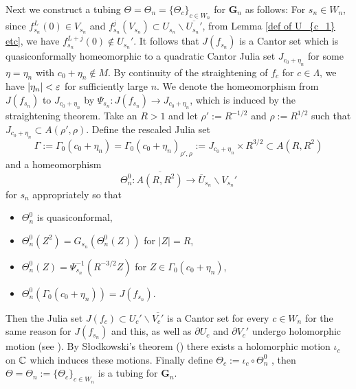 Next we construct a tubing 
$\Theta = \Theta_n = \{ \Theta_c \}_{c \in W_n}$ for $\boldsymbol{G}_n$
as follows: For $s_n \in W_n$,  since $f_{s_n}^L(0) \in V_{s_n}$ and 
$f_{s_n}^j(V_{s_n}) \subset U_{s_n} \smallsetminus \overline{U_{s_n}'}$, 
from Lemma \ref{def of U_{c_1} etc}, we have
$f_{s_n}^{L+j}(0) \notin U_{s_n}'$. It follows that $J(f_{s_n})$ is a
Cantor set which is quasiconformally homeomorphic to a quadratic Cantor
Julia set $J_{c_0+\eta_n}$ for some $\eta=\eta_n$ with 
$c_0+\eta_n \notin M$. By continuity of the straightening of $f_c$ for 
$c \in \Lambda$, we have $|\eta_n| < \varepsilon$ for sufficiently large $n$.
We denote the homeomorphism from $J(f_{s_n})$ to $J_{c_0+\eta_n}$ by 
$\Psi_{s_n} : J(f_{s_n}) \to J_{c_0+\eta_n}$, which
is induced by the straightening theorem.
Take an $R > 1$ and let $\rho' := R^{-1/2}$ and $\rho := R^{1/2}$ such
that $J_{c_0+\eta_n} \subset A(\rho', \rho)$. 
Define the rescaled Julia set
$$
  \Gamma := \Gamma_0(c_0+\eta_n) 
= \Gamma_0(c_0+\eta_n)_{\rho', \rho}
:= J_{c_0+\eta_n} \times R^{3/2}
\subset A(R, R^2) 
$$
and a homeomorphism
$$
\Theta_n^0 : \overline{A(R, R^2)} \to 
              \overline{U}_{s_n} \smallsetminus V_{s_n}'
$$ 
for $s_n$ appropriately so that 
\begin{itemize}
\setlength{\itemsep}{0.5mm} %
\item
$\Theta_n^0$ is quasiconformal,

\item
$\Theta_n^0(Z^2) = G_{s_n}(\Theta_n^0(Z))$ for $|Z| = R$, 

\item
$\Theta_n^0(Z) = \Psi_{s_n}^{-1}(R^{- 3/2}Z)$ 
for $Z \in \Gamma_0(c_0+\eta_n)$,

\item
$\Theta_n^0(\Gamma_0(c_0+\eta_n)) = J(f_{s_n})$. 
\end{itemize}

\noin 
Then the Julia set
$J(f_{c}) \subset U_c' \smallsetminus \overline{V_c'}$ is a Cantor set
for every $c \in W_n$ for the same reason for $J(f_{s_n})$ and this, 
as well as $\partial U_c$ and $\partial V_c'$ undergo holomorphic motion 
(see \cite[p.229]{Shishikura 1998}).
By S{\l}odkowski's theorem (\cite{Slodkowski 1991}) there exists a 
holomorphic motion $\iota_c$ on $\mathbb C$
which induces these motions. Finally 
define $\Theta_c := \iota_c \circ \Theta_n^0$ , then 
$\Theta = \Theta_n := \{ \Theta_c \}_{c \in W_n}$ is a
tubing for $\boldsymbol{G}_n$. 



